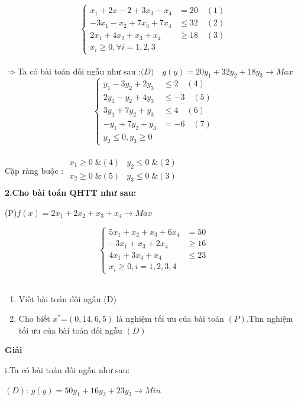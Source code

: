 \documentclass{article}
\begin{document}
\[\left\{\begin{aligned}
x_1+2x-2+3x_3-x_4&=20 \quad(1)\\
-3x_1-x_2+7x_3+7x_4&\leq 32 \quad(2)\\
2x_1+4x_2+x_3+x_4&\geq 18 \quad(3)\\
x_i\geq 0,\forall i=1,2,3
\end{aligned}\right.\]\\
$\Longrightarrow$Ta có bài toán đối ngẫu như sau :$ \big(D\big)\quad g(y)=20y_1+32y_2+18y_3 \longrightarrow Max$ \\
\[\left\{\begin{aligned}
y_1-3y_2+2y_3&\leq 2 \quad(4)\\
2y_1-y_2+4y_3&\leq-3 \quad(5)\\
3y_1+7y_2+y_3&\leq 4 \quad(6)\\
-y_1+7y_2+y_3&=-6 \quad(7)\\
y_2\leq 0,y_3\geq 0
\end{aligned}\right.\]\\
Cặp ràng buộc : $\begin{array}{cr} 
x_1\geq 0\; \&(4) &y_2\leq 0\; \&(2)\\
x_2\geq 0\; \&(5) &y_3\leq 0\; \&(3)\\
\end{array}$\\
\textbf{2.Cho bài toán QHTT như sau:}\\
\vspace{-0.4cm}
\begin{center}
\big(P\big)\quad $f(x)=2x_1+2x_2+x_3+x_4 \longrightarrow Max$\\
\end{center}
\[\left\{\begin{aligned}
5x_1+x_2+x_3+6x_4&=50 \\
-3x_1+x_3+2x_4&\geq16 \\
4x_1+3x_3+x_4&\leq23 \\
x_i\geq 0,i=1,2,3,4 
\end{aligned}\right.\]\\
\begin{enumerate}
\item Viết bài toán đối ngẫu \big(D\big)
\item Cho biết $x^*$=$\left(0,14,6,5\right)$ là nghiệm tối ưu của bài toán
 $\left(P\right)$.Tìm nghiệm tối ưu của bài toán đối ngẫu $\left(D\right)$
\end{enumerate}
\begin{center}
\textbf{Giải}
\end{center}
i.Ta có bài toán đối ngẫu như sau:\\
\vspace{-0.5cm}
\begin{center}
$\left(D\right)$: $g(y)=50y_1+16y_2+23y_3 \longrightarrow  Min$\\
\end{center}
\end{document}
